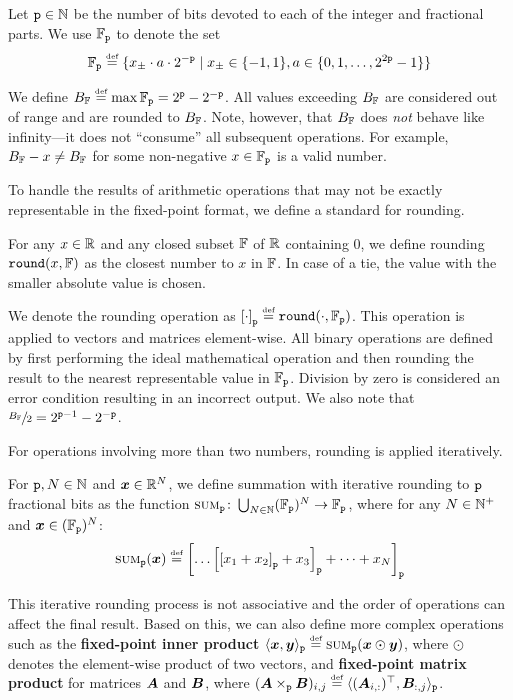 \begin{definition} 
   Let ${{\texttt{p}}} \in {{\mathbb{N}}}$ be the number of bits devoted to each of the integer and fractional parts. 
   We use ${{\mathbb{F}}}_{{\texttt{p}}}$ to denote the set
   \begin{equation}
      {{\mathbb{F}}}_{{\texttt{p}}} \mathrel{\stackrel{\textnormal{\tiny def}}{=}} \{ x_{\pm} \cdot a \cdot 2^{-{{\texttt{p}}}} \mid x_{\pm} \in \{-1, 1\}, a \in \{0, 1, \ldots, 2^{2{{\texttt{p}}}}-1\} \}
   \end{equation}
\end{definition}
We define ${{B_{{{\mathbb{F}}}}}} \mathrel{\stackrel{\textnormal{\tiny def}}{=}} \max {{\mathbb{F}}}_{{\texttt{p}}} = 2^{{\texttt{p}}} - 2^{-{{\texttt{p}}}}$.
All values exceeding ${{B_{{{\mathbb{F}}}}}}$ are considered out of range and are rounded to ${{B_{{{\mathbb{F}}}}}}$.
Note, however, that ${{B_{{{\mathbb{F}}}}}}$ does \emph{not} behave like infinity---it does not ``consume'' all subsequent operations.
For example, ${{B_{{{\mathbb{F}}}}}} - x \neq {{B_{{{\mathbb{F}}}}}}$ for some non-negative $x \in {{\mathbb{F}}}_{{\texttt{p}}}$ is a valid number.

To handle the results of arithmetic operations that may not be exactly representable in the fixed-point format, we define a standard for rounding.
\begin{definition}[Rounding]
   For any $x \in {{\mathbb{R}}}$ and any closed subset ${{\mathbb{F}}}$ of ${{\mathbb{R}}}$ containing 0, we define rounding $\roundFun{x, \F}$ as the closest number to $x$ in ${{\mathbb{F}}}$. 
   In case of a tie, the value with the smaller absolute value is chosen.
\end{definition}
We denote the rounding operation as $\roundOpFun{\cdot} \defeq \round(\cdot, \F_\numPrec)$. 
This operation is applied to vectors and matrices element-wise.
All binary operations are defined by first performing the ideal mathematical operation and then rounding the result to the nearest representable value in ${{\mathbb{F}}}_{{\texttt{p}}}$. 
Division by zero is considered an error condition resulting in an incorrect output.
We also note that $\sfrac{{{B_{{{\mathbb{F}}}}}}}{2} = 2^{{{\texttt{p}}} - 1} - 2^{-{{\texttt{p}}}}$.

For operations involving more than two numbers, rounding is applied iteratively.
\begin{definition}
   For ${{\texttt{p}}}, N \in {{\mathbb{N}}}$ and ${{{\bm{x}}}} \in {{\mathbb{R}}}^N$, we define summation with iterative rounding to ${{\texttt{p}}}$ fractional bits as the function $\textsc{sum}_{{\texttt{p}}}\colon \bigcup_{N\in{{\mathbb{N}}}}({{\mathbb{F}}}_{{{\texttt{p}}}})^{N}\rightarrow{{\mathbb{F}}}_{{{\texttt{p}}}}$, where for any $N\in{{\mathbb{N}}}^{+}$ and ${{{\bm{x}}}} \in ({{\mathbb{F}}}_{{\texttt{p}}})^N$:
   \begin{equation}
      \textsc{sum}_\numPrec(\vx) \defeq \roundOpFun{\dots\roundOpFun{\roundOpFun{\evx_1 + \evx_2} + \evx_3} + \dots + \evx_N}
   \end{equation}
\end{definition}
This iterative rounding process is not associative and the order of operations can affect the final result. 
Based on this, we can also define more complex operations such as the \textbf{fixed-point inner product} $\langle {{{\bm{x}}}}, {{{\bm{y}}}} \rangle_{{\texttt{p}}} \mathrel{\stackrel{\textnormal{\tiny def}}{=}} \textsc{sum}_{{\texttt{p}}}({{{\bm{x}}}} \odot {{{\bm{y}}}})$, where $\odot$ denotes the element-wise product of two vectors, and \textbf{fixed-point matrix product} for matrices ${{{\bm{A}}}}$ and ${{{\bm{B}}}}$, where $({{{\bm{A}}}} \times_{{\texttt{p}}} {{{\bm{B}}}})_{i,j} \mathrel{\stackrel{\textnormal{\tiny def}}{=}} \langle ({{{\bm{A}}}}_{i,:})^\top, {{{\bm{B}}}}_{:,j} \rangle_{{\texttt{p}}}$.


